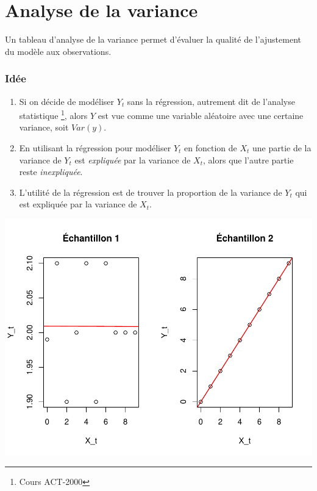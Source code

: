 \documentclass[11pt,french]{report}
\begin{document}
\section{Analyse de la variance}
\label{sec:anaVar}
Un tableau d'analyse de la variance permet d'évaluer la qualité de l'ajustement du modèle aux observations.

\subsubsection*{Idée}
\begin{enumerate}
\item Si on décide de modéliser $Y_t$ sans la régression, autrement dit de l'analyse statistique \footnote{Cours ACT-2000}, alors $Y$ est vue comme une variable aléatoire avec une certaine variance, soit $Var(y)$.
\item En utilisant la régression pour modéliser $Y_t$ en fonction de $X_t$ une partie de la variance de $Y_t$ est \emph{expliquée} par la variance de $X_t$, alors que l'autre partie reste \emph{inexpliquée}.
\item L'utilité de la régression est de trouver la proportion de la variance de $Y_t$ qui est expliquée par la variance de $X_t$.
\end{enumerate}

\includegraphics{notes_de_cours-012}
\end{document}
